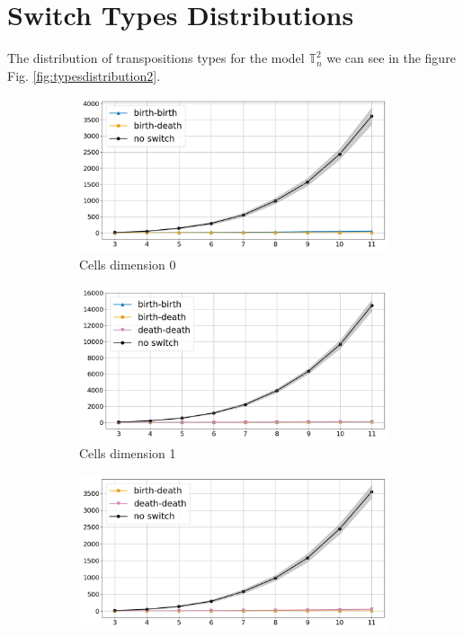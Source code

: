 \documentclass{article}
\begin{document}
\section{Switch Types Distributions}

\par The distribution of transpositions types for the model $\mathbb{T}^{2}_n$ we can see in the figure Fig. \ref{fig:typesdistribution2}.
\begin{figure}[htbp]
\centering
\begin{subfigure}[b]{0.3\textwidth}
    \includegraphics[width=\linewidth]{pics/torus-transpositions-extended/transposition-types-complex-dim2-subposet-dim0-drop-no-switches-False.png}
    \caption{Cells dimension 0}
    \label{fig:complex2cells0}
\end{subfigure}
\hfill
\begin{subfigure}[b]{0.3\textwidth}
    \includegraphics[width=\linewidth]{pics/torus-transpositions-extended/transposition-types-complex-dim2-subposet-dim1-drop-no-switches-False.png}
    \caption{Cells dimension 1}
    \label{fig:complex2cells1}
\end{subfigure}
\hfill
\begin{subfigure}[b]{0.3\textwidth}
    \includegraphics[width=\linewidth]{pics/torus-transpositions-extended/transposition-types-complex-dim2-subposet-dim2-drop-no-switches-False.png}

\end{subfigure}
\end{figure}
\end{document}
